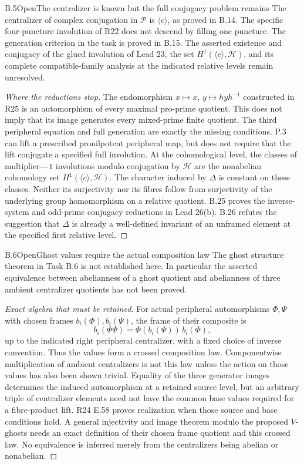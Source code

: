 \begin{statement}{B.5}{Open}{The centralizer is known but the full conjugacy problem remains}
The centralizer of complex conjugation in $\mathcal P$ is
$\langle c\rangle$, as proved in B.14. The specific four-puncture
involution of R22 does not descend by filling one puncture.
The generation criterion in the task is proved in B.15.
The asserted existence and conjugacy of the glued involution of
Lead 23, the set $H^1(\langle c\rangle,\mathcal H)$, and its
complete compatible-family analysis at the indicated relative
levels remain unresolved.
\end{statement}
\begin{proof}[Where the reductions stop]
The endomorphism $x\mapsto x$, $y\mapsto hyh^{-1}$ constructed
in R25 is an automorphism of every maximal pro-prime quotient.
This does not imply that its image generates every mixed-prime
finite quotient. The third peripheral equation and full generation
are exactly the missing conditions. P.3 can lift a prescribed
pronilpotent peripheral map, but does not require that the lift
conjugate a specified full involution. At the cohomological level,
the classes of multiplier-$-1$ involutions modulo conjugation by
$\mathcal H$ are the nonabelian cohomology set
$H^1(\langle c\rangle,\mathcal H)$. The character induced by
$\Delta$ is constant on these classes. Neither its surjectivity
nor its fibres follow from surjectivity of the underlying group
homomorphism on a relative quotient.
B.25 proves the inverse-system and odd-prime conjugacy
reductions in Lead 26(b). B.26 refutes the suggestion that
$\Delta$ is already a well-defined invariant of an unframed
element at the specified first relative level.
\end{proof}

\begin{statement}{B.6}{Open}{Ghost values require the actual composition law}
The ghost structure theorem in Task B.6 is not established here.
In particular the asserted equivalence between abelianness of a
ghost quotient and abelianness of three ambient centralizer
quotients has not been proved.
\end{statement}
\begin{proof}[Exact algebra that must be retained]
For actual peripheral automorphisms $\Phi,\Psi$ with chosen frames
$b_i(\Phi),b_i(\Psi)$, the frame of their composite is
\[
 b_i(\Phi\Psi)=\Phi(b_i(\Psi))\,b_i(\Phi),
\]
up to the indicated right peripheral centralizer, with a fixed
choice of inverse convention. Thus the values form a crossed
composition law. Componentwise multiplication of ambient
centralizers is not this law unless the action on those values
has also been shown trivial. Equality of the three generator
images determines the induced automorphism at a retained source
level, but an arbitrary triple of centralizer elements need not
have the common base values required for a fibre-product lift.
R24 E.58 proves realization when those source and base conditions
hold. A general injectivity and image theorem modulo the proposed
$V$-ghosts needs an exact definition of their chosen frame quotient
and this crossed law. No equivalence is inferred merely from the
centralizers being abelian or nonabelian.
\end{proof}

